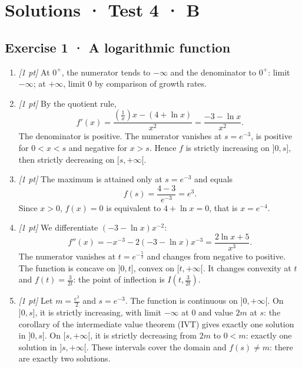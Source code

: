 \ifmxteacher\mxnewpage

\section*{Solutions · Test 4 · B}\label{cor:6-4}

\subsection*{Exercise 1 · A logarithmic function}\begin{enumerate}

\item \textit{[1 pt]} At $0^+$, the numerator tends to $-\infty$ and the denominator to $0^+$: limit $-\infty$; at $+\infty$, limit $0$ by comparison of growth rates.

\item \textit{[1 pt]} By the quotient rule,
\[f'(x)=\frac{(\frac{1}{x})x-(4+\ln x)}{x^2}=\frac{-3-\ln x}{x^2}.\]
The denominator is positive. The numerator vanishes at $s=e^{-3}$, is positive for $0<x<s$ and negative for $x>s$. Hence $f$ is strictly increasing on $]0,s]$, then strictly decreasing on $[s,+\infty[$.

\item \textit{[1 pt]} The maximum is attained only at $s=e^{-3}$ and equals
\[f(s)=\frac{4- 3}{e^{-3}}=e^{3}.\]
Since $x>0$, $f(x)=0$ is equivalent to $4+\ln x=0$, that is $x=e^{-4}$.

\item \textit{[1 pt]} We differentiate $(-3-\ln x)x^{-2}$:
\[f''(x)=-x^{-3}-2(-3-\ln x)x^{-3}=\frac{2\ln x+5}{x^3}.\]
The numerator vanishes at $t=e^{-\frac{5}{2}}$ and changes from negative to positive. The function is concave on $]0,t]$, convex on $[t,+\infty[$. It changes convexity at $t$ and $f(t)=\frac{3}{2t}$: the point of inflection is $I(t,\frac{3}{2t})$.

\item \textit{[1 pt]} Let $m=\frac{e^{3}}{2}$ and $s=e^{-3}$. The function is continuous on $]0,+\infty[$. On $]0,s]$, it is strictly increasing, with limit $-\infty$ at $0$ and value $2m$ at $s$: the corollary of the intermediate value theorem (IVT) gives exactly one solution in $]0,s[$. On $[s,+\infty[$, it is strictly decreasing from $2m$ to $0<m$: exactly one solution in $]s,+\infty[$. These intervals cover the domain and $f(s)\ne m$: there are exactly two solutions.

\end{enumerate}

